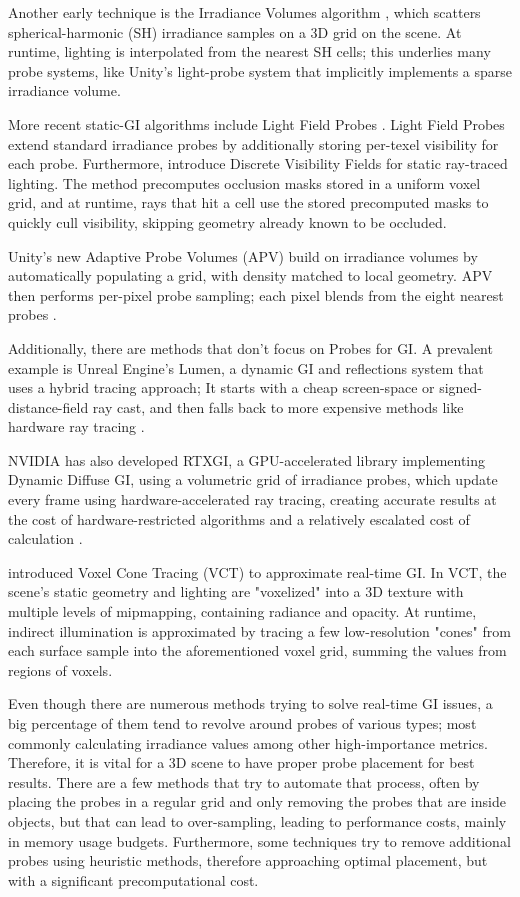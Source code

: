 Another early technique is the Irradiance Volumes algorithm  \parencite{Greger1998}, which scatters spherical-harmonic (SH) irradiance samples on a 3D grid on the scene. At runtime, lighting is interpolated from the nearest SH cells; this underlies many probe systems, like Unity's light-probe system that implicitly implements a sparse irradiance volume.

More recent static-GI algorithms include Light Field Probes \parencite{McGuire2017}. Light Field Probes extend standard irradiance probes by additionally storing per-texel visibility for each probe. Furthermore, \cite{Xu2022} introduce Discrete Visibility Fields for static ray-traced lighting. The method precomputes occlusion masks stored in a uniform voxel grid, and at runtime, rays that hit a cell use the stored precomputed masks to quickly cull visibility, skipping geometry already known to be occluded.

Unity's new Adaptive Probe Volumes (APV) build on irradiance volumes by automatically populating a grid, with density matched to local geometry. APV then performs per-pixel probe sampling; each pixel blends from the eight nearest probes \parencite{Unity2025}.

Additionally, there are methods that don't focus on Probes for GI. A prevalent example is Unreal Engine's Lumen, a dynamic GI and reflections system that uses a hybrid tracing approach; It starts with a cheap screen-space or signed-distance-field ray cast, and then falls back to more expensive methods like hardware ray tracing \parencite{Unreal2025}.

NVIDIA has also developed RTXGI, a GPU-accelerated library implementing Dynamic Diffuse GI, using a volumetric grid of irradiance probes, which update every frame using hardware-accelerated ray tracing, creating accurate results at the cost of hardware-restricted algorithms and a relatively escalated cost of calculation \parencite{Nvidia2024}.

\cite{Crassin2011} introduced Voxel Cone Tracing (VCT) to approximate real-time GI. In VCT, the scene's static geometry and lighting are "voxelized" into a 3D texture with multiple levels of mipmapping, containing radiance and opacity. At runtime, indirect illumination is approximated by tracing a few low-resolution "cones" from each surface sample into the aforementioned voxel grid, summing the values from regions of voxels.\newline

Even though there are numerous methods trying to solve real-time GI issues, a big percentage of them tend to revolve around probes of various types; most commonly calculating irradiance values among other high-importance metrics. Therefore, it is vital for a 3D scene to have proper probe placement for best results. There are a few methods that try to automate that process, often by placing the probes in a regular grid and only removing the probes that are inside objects, but that can lead to over-sampling, leading to performance costs, mainly in memory usage budgets. Furthermore, some techniques try to remove additional probes using heuristic methods, therefore approaching optimal placement, but with a significant precomputational cost.

